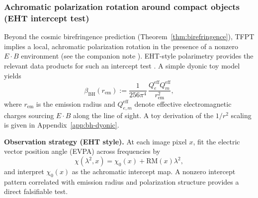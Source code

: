 \subsubsection{Achromatic polarization rotation around compact objects (EHT intercept test)}
\label{sec:eht-intercept}

Beyond the cosmic birefringence prediction (Theorem~\ref{thm:birefringence}), TFPT implies a local, achromatic polarization rotation
in the presence of a nonzero $E\cdot B$ environment (see the companion note \cite{bhAchromaticRotationNote2025}). EHT-style polarimetry
provides the relevant data products for such an intercept test \cite{ehtm87pol2021}. A simple dyonic toy model yields
\begin{equation}
\beta_{\mathrm{BH}}(r_{\mathrm{em}})
:= \frac{1}{256\pi^4}\,\frac{Q^{\mathrm{eff}}_e Q^{\mathrm{eff}}_m}{r_{\mathrm{em}}^2},
\end{equation}
where $r_{\mathrm{em}}$ is the emission radius and $Q^{\mathrm{eff}}_{e,m}$ denote effective electromagnetic charges sourcing $E\cdot B$ along the line of sight. A toy derivation of the $1/r^2$ scaling is given in Appendix~\ref{app:bh-dyonic}.

\textbf{Observation strategy (EHT style).}
At each image pixel $x$, fit the electric vector position angle (EVPA) across frequencies by
\begin{equation}
\chi(\lambda^2,x)=\chi_0(x)+\mathrm{RM}(x)\lambda^2,
\end{equation}
and interpret $\chi_0(x)$ as the achromatic intercept map. A nonzero intercept pattern correlated
with emission radius and polarization structure provides a direct falsifiable test.

